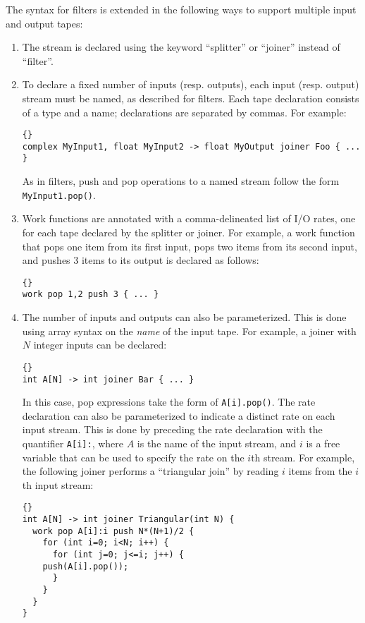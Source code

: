 \documentclass[11pt]{article}
\begin{document}
The syntax for filters is extended in the following ways to support
multiple input and output tapes:
\begin{enumerate}

\item The stream is declared using the keyword ``splitter'' or
``joiner'' instead of ``filter''.

\item To declare a fixed number of inputs (resp. outputs), each input
(resp. output) stream must be named, as described for filters.  Each
tape declaration consists of a type and a name; declarations are
separated by commas.  For example:
\begin{lstlisting}{}
complex MyInput1, float MyInput2 -> float MyOutput joiner Foo { ... }
\end{lstlisting}
As in filters, push and pop operations to a named stream follow the
form \lstinline|MyInput1.pop()|.

\item Work functions are annotated with a comma-delineated list of I/O
rates, one for each tape declared by the splitter or joiner.  For
example, a work function that pops one item from its first input, pops
two items from its second input, and pushes 3 items to its output is
declared as follows:
\begin{lstlisting}{}
work pop 1,2 push 3 { ... }
\end{lstlisting}

\item The number of inputs and outputs can also be parameterized.
This is done using array syntax on the {\it name} of the input tape.
For example, a joiner with $N$ integer inputs can be declared:
\begin{lstlisting}{}
int A[N] -> int joiner Bar { ... }
\end{lstlisting}
In this case, pop expressions take the form of \lstinline|A[i].pop()|.
The rate declaration can also be parameterized to indicate a distinct
rate on each input stream.  This is done by preceding the rate
declaration with the quantifier \lstinline|A[i]:|, where $A$ is the
name of the input stream, and $i$ is a free variable that can be used
to specify the rate on the $i$th stream.  For example, the following
joiner performs a ``triangular join'' by reading $i$ items from the
$i$th input stream:
\begin{lstlisting}{}
int A[N] -> int joiner Triangular(int N) {
  work pop A[i]:i push N*(N+1)/2 {
    for (int i=0; i<N; i++) {
      for (int j=0; j<=i; j++) {
	push(A[i].pop());
      }      
    }
  }
}
\end{lstlisting}


\end{enumerate}
\end{document}
